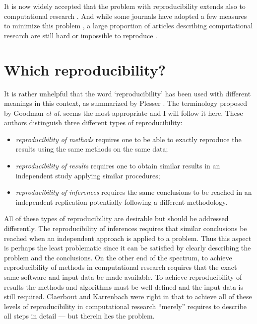 It is now widely accepted that the problem with reproducibility extends also to computational research \cite{mesirov2010,peng2011,stodden2016}. And while some journals have adopted a few measures to minimize this problem  \cite{greenbaum2017,guerreiro2017,loew2015,peng2009}, a large proportion of articles describing computational research are still hard or impossible to reproduce \cite{hothorn2009,hothorn2011,hubner2011,stodden2018}.

\section{Which reproducibility?}
\label{sec:which}
It is rather unhelpful that the word `reproducibility' has been used with different meanings in this context, as summarized by Plesser \cite{plesser2018}. The terminology proposed by Goodman {\it et al.} \cite{goodman2016} seems the most appropriate and I will follow it here. These authors distinguish three different types of reproducibility:
\begin{itemize}
\item {\it reproducibility of methods} requires one to be able to exactly reproduce the results using the same methods on the same data;
\item {\it reproducibility of results} requires one to obtain similar results in an independent study applying similar procedures;
\item {\it reproducibility of inferences} requires the same conclusions to be reached in an independent replication potentially following a different methodology.
\end{itemize}
All of these types of reproducibility are desirable but should be addressed differently. The reproducibility of inferences requires that similar conclusions be reached when an independent approach is applied to a problem. Thus this aspect is perhaps the least problematic since it  can be satisfied by clearly describing the problem and the conclusions. On the other end of the spectrum, to achieve reproducibility of methods in computational research requires that the exact same software and input data be made available. To achieve reproducibility of results the methods and algorithms must be well defined and the input data is still required. Claerbout and Karrenbach were right in that to achieve all of these levels of reproducibility in computational research ``merely'' requires to describe all steps in detail --- but therein lies the problem.

